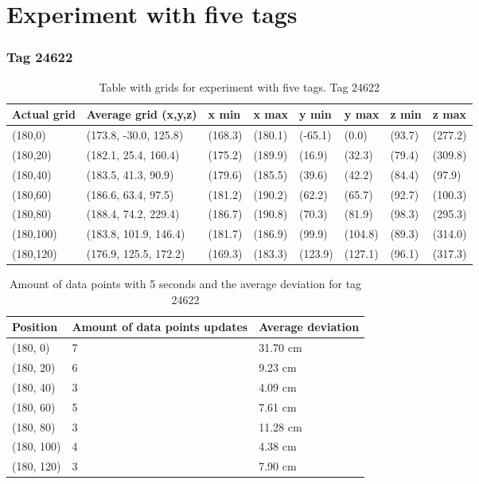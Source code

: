 \section{Experiment with five tags}

\subsubsection{Tag 24622}
\begin{table}[H] 
    \begin{tabular}{|l|l|l|l|l|l|l|l|}
    \hline
    Actual grid & Average grid (x,y,z)   & x min   & x max   & y min    & y max   & z min   & z max    \\ \hline
    (180,0) 	& (173.8, -30.0, 125.8) 	 & (168.3) 	& (180.1)	& (-65.1)	 & (0.0) 	 & (93.7)	 & (277.2)	\\ \hline
    (180,20) 	& (182.1, 25.4, 160.4) 	 	& (175.2) 	& (189.9)	& (16.9)	 & (32.3) 	 & (79.4)	 & (309.8)	\\ \hline
    (180,40) 	& (183.5, 41.3, 90.9) 	 	& (179.6) 	& (185.5)	& (39.6)	 & (42.2) 	 & (84.4)	 & (97.9)	\\ \hline
    (180,60) 	& (186.6, 63.4, 97.5) 	 	& (181.2) 	& (190.2)	& (62.2)	 & (65.7) 	 & (92.7)	 & (100.3)	\\ \hline
    (180,80) 	& (188.4, 74.2, 229.4) 	 	& (186.7) 	& (190.8)	& (70.3)	 & (81.9) 	 & (98.3)	 & (295.3)	\\ \hline
    (180,100) 	& (183.8, 101.9, 146.4) 	 & (181.7) 	& (186.9)	& (99.9)	 & (104.8) 	 & (89.3)	 & (314.0)	\\ \hline
    (180,120) 	& (176.9, 125.5, 172.2) 	 & (169.3) 	& (183.3)	& (123.9)	 & (127.1) 	 & (96.1)	 & (317.3)	\\ \hline
    \end{tabular}
\caption{Table with grids for experiment with five tags. Tag 24622}
\end{table}

\begin{table}[H]
    \centering
    \begin{tabular}{|l|l|l|}
    \hline
    Position   & Amount of data points updates & Average deviation \\ \hline
    (180, 0)   & 7                             &  31.70 cm                 \\ \hline
    (180, 20)  & 6                             &  9.23 cm                \\ \hline
    (180, 40)  & 3                             &  4.09 cm                \\ \hline
    (180, 60)  & 5                             &  7.61 cm                 \\ \hline
    (180, 80)  & 3                             &  11.28 cm                 \\ \hline
    (180, 100) & 4                             &  4.38 cm                 \\ \hline
    (180, 120) & 3                             &  7.90 cm                 \\ \hline
    \end{tabular}
    \caption{Amount of data points with 5 seconds and the average deviation for tag 24622}
\end{table}

